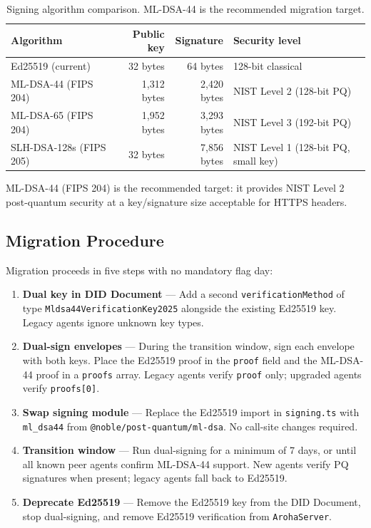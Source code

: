 \documentclass[11pt,a4paper]{article}
\begin{document}
\begin{table}[ht]
  \centering
  \renewcommand{\arraystretch}{1.4}
  \begin{tabularx}{\textwidth}{@{} l r r l @{}}
    \toprule
    \textbf{Algorithm} & \textbf{Public key} & \textbf{Signature} & \textbf{Security level} \\
    \midrule
    Ed25519 (current)       &     32 bytes &      64 bytes & 128-bit classical \\
    ML-DSA-44 (FIPS 204)    &  1,312 bytes &   2,420 bytes & NIST Level 2 (128-bit PQ) \\
    ML-DSA-65 (FIPS 204)    &  1,952 bytes &   3,293 bytes & NIST Level 3 (192-bit PQ) \\
    SLH-DSA-128s (FIPS 205) &     32 bytes &   7,856 bytes & NIST Level 1 (128-bit PQ, small key) \\
    \bottomrule
  \end{tabularx}
  \caption{Signing algorithm comparison. ML-DSA-44 is the recommended migration target.}
\end{table}

ML-DSA-44 (FIPS 204) is the recommended target: it provides NIST Level 2
post-quantum security at a key/signature size acceptable for HTTPS headers.

\subsection{Migration Procedure}

Migration proceeds in five steps with no mandatory flag day:

\begin{enumerate}[label=\textbf{Step \arabic*:}, leftmargin=*]
  \item \textbf{Dual key in DID Document} --- Add a second
        \texttt{verificationMethod} of type \texttt{Mldsa44VerificationKey2025}
        alongside the existing Ed25519 key. Legacy agents ignore unknown key types.

  \item \textbf{Dual-sign envelopes} --- During the transition window, sign each
        envelope with both keys. Place the Ed25519 proof in the \texttt{proof}
        field and the ML-DSA-44 proof in a \texttt{proofs} array. Legacy agents
        verify \texttt{proof} only; upgraded agents verify \texttt{proofs[0]}.

  \item \textbf{Swap signing module} --- Replace the Ed25519 import in
        \texttt{signing.ts} with \texttt{ml\_dsa44} from
        \texttt{@noble/post-quantum/ml-dsa}. No call-site changes required.

  \item \textbf{Transition window} --- Run dual-signing for a minimum of 7 days,
        or until all known peer agents confirm ML-DSA-44 support. New agents verify
        PQ signatures when present; legacy agents fall back to Ed25519.

  \item \textbf{Deprecate Ed25519} --- Remove the Ed25519 key from the DID
        Document, stop dual-signing, and remove Ed25519 verification from
        \texttt{ArohaServer}.
\end{enumerate}
\end{document}
